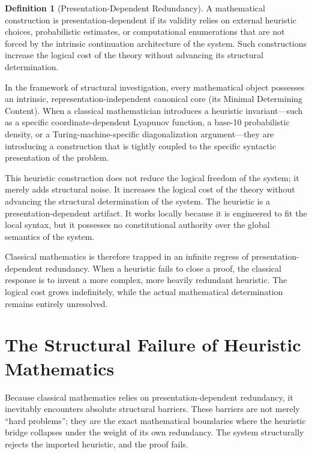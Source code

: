 \documentclass[12pt,openany]{extbook}
\theoremstyle{plain}
\theoremstyle{definition}
\newtheorem{definition}{Definition}[chapter]
\begin{document}
\begin{definition}[Presentation-Dependent Redundancy]
A mathematical construction is presentation-dependent if its validity relies on external heuristic choices, probabilistic estimates, or computational enumerations that are not forced by the intrinsic continuation architecture of the system. Such constructions increase the logical cost of the theory without advancing its structural determination.
\end{definition}

In the framework of structural investigation, every mathematical object possesses an intrinsic, representation-independent canonical core (its Minimal Determining Content). When a classical mathematician introduces a heuristic invariant---such as a specific coordinate-dependent Lyapunov function, a base-10 probabilistic density, or a Turing-machine-specific diagonalization argument---they are introducing a construction that is tightly coupled to the specific syntactic presentation of the problem. 

This heuristic construction does not reduce the logical freedom of the system; it merely adds structural noise. It increases the logical cost of the theory without advancing the structural determination of the system. The heuristic is a presentation-dependent artifact. It works locally because it is engineered to fit the local syntax, but it possesses no constitutional authority over the global semantics of the system.

Classical mathematics is therefore trapped in an infinite regress of presentation-dependent redundancy. When a heuristic fails to close a proof, the classical response is to invent a more complex, more heavily redundant heuristic. The logical cost grows indefinitely, while the actual mathematical determination remains entirely unresolved.

\section{The Structural Failure of Heuristic Mathematics}

Because classical mathematics relies on presentation-dependent redundancy, it inevitably encounters absolute structural barriers. These barriers are not merely ``hard problems''; they are the exact mathematical boundaries where the heuristic bridge collapses under the weight of its own redundancy. The system structurally rejects the imported heuristic, and the proof fails.
\end{document}
